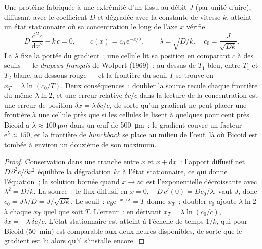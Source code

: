 \begin{theorem}\label{thm:b3:developmental-genetics:gradient}
Une protéine fabriquée à une extrémité d'un tissu au débit $J$ (par
unité d'aire), diffusant avec le coefficient $D$ et dégradée avec la
constante de vitesse $k$, atteint un état stationnaire où sa
concentration le long de l'axe $x$ vérifie
\[
D\,\frac{\mathrm{d}^{2}c}{\mathrm{d}x^{2}} - k\,c = 0,
\qquad c(x) = c_{0}\,\mathrm{e}^{-x/\lambda}, \qquad \lambda = \sqrt{D/k},
\quad c_{0} = \frac{J}{\sqrt{Dk}} .
\]
La \emph{} $\lambda$ fixe la portée du
gradient~; une cellule lit sa position en comparant $c$ à des seuils ---
le \emph{drapeau français} de Wolpert (1969)~: au-dessus de $T_{1}$
bleu, entre $T_{1}$ et $T_{2}$ blanc, au-dessous rouge --- et la
frontière du seuil $T$ se trouve en $x_{T} = \lambda\ln(c_{0}/T)$. Deux
conséquences~: doubler la source recule chaque frontière du même
$\lambda\ln 2$, et une erreur relative $\delta c/c$ dans la lecture de la
concentration est une erreur de position $\delta x = \lambda\,\delta c/c$,
de sorte qu'un gradient ne peut placer une frontière à une cellule près
que si les cellules le lisent à quelques pour cent près. Bicoid a
$\lambda \approx \qty{100}{\micro m}$ dans un œuf de \qty{500}{\micro m}~:
le gradient couvre un facteur $\mathrm{e}^{5}
\approx 150$, et la frontière de \emph{hunchback} se place au milieu de
l'œuf, là où Bicoid est tombée à environ un douzième de son maximum.
\end{theorem}
\begin{proof}
Conservation dans une tranche entre $x$ et $x + \mathrm{d}x$~: l'apport
diffusif net $D\,\partial^{2}c/\partial x^{2}$ équilibre la dégradation
$kc$ à l'état stationnaire, ce qui donne l'équation~; la solution bornée
quand $x \to \infty$ est l'exponentielle décroissante avec
$\lambda^{2} = D/k$. La source~: le flux diffusif en $x = 0$, $-D\,
c'(0) = Dc_{0}/\lambda$, vaut $J$, donc $c_{0} = J\lambda/D =
J/\sqrt{Dk}$. Le seuil~: $c_{0}\mathrm{e}^{-x_{T}/\lambda} = T$ donne
$x_{T}$~; doubler $c_{0}$ ajoute $\lambda\ln 2$ à chaque $x_{T}$ quel que
soit $T$. L'erreur~: en dérivant $x_{T} = \lambda\ln(c_{0}/c)$,
$\delta x = -\lambda\,\delta c/c$. L'état stationnaire est atteint à
l'échelle de temps $1/k$, qui pour Bicoid (\qty{50}{min}) est comparable
aux deux heures disponibles, de sorte que le gradient est lu alors qu'il
s'installe encore.
\end{proof}

